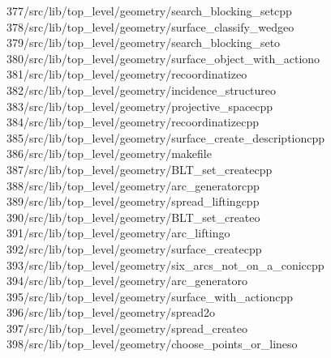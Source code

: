 \begin{tabbing}
377\>/src/lib/top\_level/geometry/search\_blocking\_setcpp\\[0pt]
378\>/src/lib/top\_level/geometry/surface\_classify\_wedgeo\\[0pt]
379\>/src/lib/top\_level/geometry/search\_blocking\_seto\\[0pt]
380\>/src/lib/top\_level/geometry/surface\_object\_with\_actiono\\[0pt]
381\>/src/lib/top\_level/geometry/recoordinatizeo\\[0pt]
382\>/src/lib/top\_level/geometry/incidence\_structureo\\[0pt]
383\>/src/lib/top\_level/geometry/projective\_spacecpp\\[0pt]
384\>/src/lib/top\_level/geometry/recoordinatizecpp\\[0pt]
385\>/src/lib/top\_level/geometry/surface\_create\_descriptioncpp\\[0pt]
386\>/src/lib/top\_level/geometry/makefile\\[0pt]
387\>/src/lib/top\_level/geometry/BLT\_set\_createcpp\\[0pt]
388\>/src/lib/top\_level/geometry/arc\_generatorcpp\\[0pt]
389\>/src/lib/top\_level/geometry/spread\_liftingcpp\\[0pt]
390\>/src/lib/top\_level/geometry/BLT\_set\_createo\\[0pt]
391\>/src/lib/top\_level/geometry/arc\_liftingo\\[0pt]
392\>/src/lib/top\_level/geometry/surface\_createcpp\\[0pt]
393\>/src/lib/top\_level/geometry/six\_arcs\_not\_on\_a\_coniccpp\\[0pt]
394\>/src/lib/top\_level/geometry/arc\_generatoro\\[0pt]
395\>/src/lib/top\_level/geometry/surface\_with\_actioncpp\\[0pt]
396\>/src/lib/top\_level/geometry/spread2o\\[0pt]
397\>/src/lib/top\_level/geometry/spread\_createo\\[0pt]
398\>/src/lib/top\_level/geometry/choose\_points\_or\_lineso\\[0pt]

\end{tabbing}
